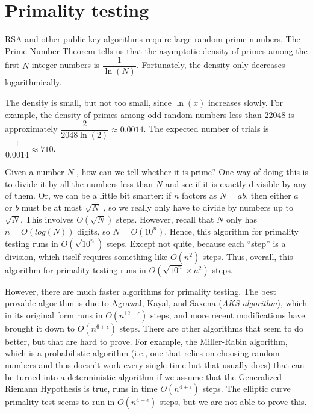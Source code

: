 \documentclass[a4paper, 12pt]{book} %
\begin{document}
\section{Primality testing}

RSA and other public key algorithms require large random prime numbers. The Prime
Number Theorem tells us that the asymptotic density of primes among the first $N$
integer numbers is $\dfrac{1}{\ln(N)}$. Fortunately, the density only decreases logarithmically.

\begin{example}
    The density is small, but not too small, since $\ln(x)$ increases slowly. For example, the density of primes among odd random numbers less than 22048 is approximately $\dfrac{2}{2048\ln(2)} \approx 0.0014$. The expected number of trials is $\dfrac{1}{0.0014} \approx 710$.
\end{example}

Given a number $N$ , how can we tell whether it is prime? One way of doing this is to divide it by all the numbers less than $N$ and see if it is exactly divisible by any of them. Or, we can be a little bit smarter: if $n$ factors as $N = ab$, then either $a$ or $b$ must be at most $\sqrt{N}$ , so we really only have to divide by numbers up to $\sqrt{N}$. This involves $O(\sqrt{N})$ steps. However, recall that $N$ only has $n = O(log(N ))$ digits, so $N = O(10^n)$. Hence, this algorithm for primality testing runs in $O(\sqrt{10^n})$ steps. Except not quite, because each ``step'' is a division, which itself requires something like $O(n^2)$ steps. Thus, overall, this algorithm for primality testing runs in $O(\sqrt{10^n} \times n^2)$ steps.

However, there are much faster algorithms for primality testing. The best provable algorithm is due to Agrawal, Kayal, and Saxena (\emph{AKS algorithm}), which in its
original form runs in $O(n^{12+\epsilon})$ steps, and more recent modifications have brought it down to $O(n^{6+\epsilon})$ steps. There are other algorithms that seem to do better, but that are hard to prove. For example, the Miller-Rabin algorithm, which is a probabilistic algorithm (i.e., one that relies on choosing random numbers and thus doesn't work every single time but that usually does) that can be turned into a deterministic algorithm if we assume that the Generalized Riemann Hypothesis is true, runs in time $O(n^{4+\epsilon})$ steps. The elliptic curve primality test seems to run in $O(n^{4+\epsilon})$ steps, but we are not able to prove this. 
\end{document}
